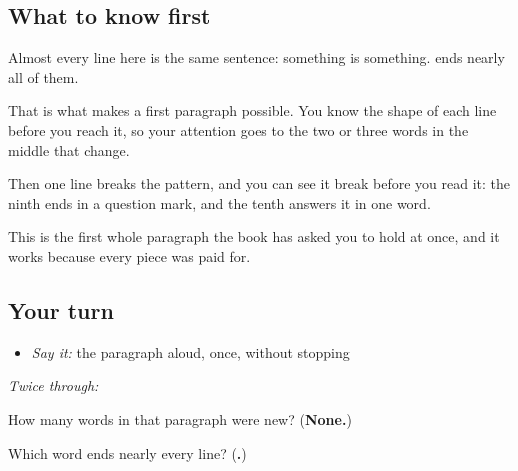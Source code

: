 \subsection*{What to know first}
Almost every line here is the same sentence: something is something. \textbf{} ends nearly all of them.

That is what makes a first paragraph possible. You know the shape of each line before you reach it, so your attention goes to the two or three words in the middle that change.

Then one line breaks the pattern, and you can see it break before you read it: the ninth ends in a question mark, and the tenth answers it in one word.

This is the first whole paragraph the book has asked you to hold at once, and it works because every piece was paid for.

\subsection*{Your turn}
\begin{itemize}
\raggedright
  \item \emph{Say it:} the paragraph aloud, once, without stopping
\end{itemize}

\emph{Twice through:}

\begin{tcolorbox}[breakable,colback=teal!4,colframe=teal!35!black,title={Before you move on}]
How many words in that paragraph were new? (\textbf{None.})

Which word ends nearly every line? (\textbf{.})
\end{tcolorbox}

